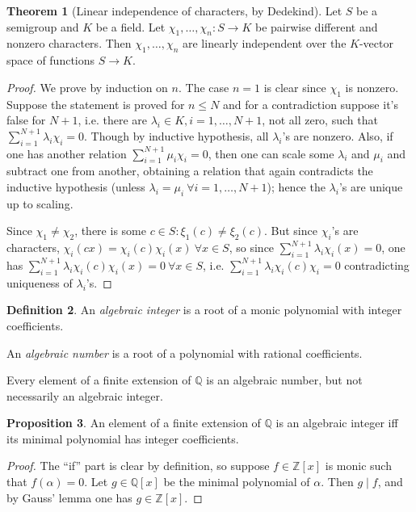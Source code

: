 \documentclass{article}
\newcommand{\Z}{\mathbb{Z}}
\newcommand{\Q}{\mathbb{Q}}
\theoremstyle{definition}
\newtheorem{defn}{Definition}[subsection]
\newtheorem{prop}[defn]{Proposition}
\newtheorem{thm}[defn]{Theorem}
\begin{document}
\begin{thm}[Linear independence of characters, by Dedekind]
\label{thm:dedekind}
Let $S$ be a semigroup and $K$ be a field. Let $\chi_1,\ldots,\chi_n:S\rightarrow K$ be pairwise different and nonzero characters. Then $\chi_1,\ldots,\chi_n$ are linearly independent over the $K$-vector space of functions $S\rightarrow K$.
\end{thm}
\begin{proof}
We prove by induction on $n$. The case $n=1$ is clear since $\chi_1$ is nonzero. Suppose the statement is proved for $n\leq N$ and for a contradiction suppose it's false for $N+1$, i.e. there are $\lambda_i\in K,i=1,\ldots,N+1$, not all zero, such that $\sum_{i=1}^{N+1} \lambda_i\chi_i=0$. Though by inductive hypothesis, all $\lambda_i$'s are nonzero. Also, if one has another relation $\sum_{i=1}^{N+1}\mu_i\chi_i=0$, then one can scale some $\lambda_i$ and $\mu_i$ and subtract one from another, obtaining a relation that again contradicts the inductive hypothesis (unless $\lambda_i=\mu_i \ \forall i=1,\ldots,N+1$); hence the $\lambda_i$'s are unique up to scaling.

Since $\chi_1\neq\chi_2$, there is some $c\in S:\xi_1(c)\neq\xi_2(c)$. But since $\chi_i$'s are characters, $\chi_i(cx)=\chi_i(c)\chi_i(x) \ \forall x\in S$, so since $\sum_{i=1}^{N+1}\lambda_i\chi_i(x)=0$, one has $\sum_{i=1}^{N+1}\lambda_i\chi_i(c)\chi_i(x)=0 \ \forall x\in S$, i.e. $\sum_{i=1}^{N+1}\lambda_i\chi_i(c)\chi_i=0$ contradicting uniqueness of $\lambda_i$'s.
\end{proof}

\begin{defn}
An \textit{algebraic integer} is a root of a monic polynomial with integer coefficients.

An \textit{algebraic number} is a root of a polynomial with rational coefficients.
\end{defn}

Every element of a finite extension of $\Q$ is an algebraic number, but not necessarily an algebraic integer.

\begin{prop}
An element of a finite extension of $\Q$ is an algebraic integer iff its minimal polynomial has integer coefficients.
\end{prop}

\begin{proof}
The ``if'' part is clear by definition, so suppose $f\in\Z[x]$ is monic such that $f(\alpha)=0$. Let $g\in\Q[x]$ be the minimal polynomial of $\alpha$. Then $g\mid f$, and by Gauss' lemma one has $g\in\Z[x]$. 
\end{proof}
\end{document}
